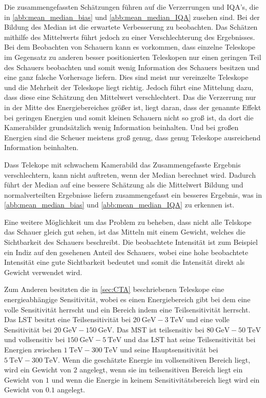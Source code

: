 Die zusammengefassten Schätzungen führen auf die Verzerrungen und IQA's, die in \autoref{abb:mean_median_bias} und \autoref{abb:mean_median_IQA} zusehen sind.
Bei der Bildung des Median ist die erwartete Verbesserung zu beobachten.
Das Schätzen mithilfe des Mittelwerts führt jedoch zu einer Verschlechterung des Ergebnisses.
Bei dem Beobachten von Schauern kann es vorkommen, dass einzelne Teleskope im Gegensatz zu anderen besser positionierten Teleskopen nur einen geringen Teil
des Schauers beobachten und somit wenig Information des Schauers besitzen und eine ganz falsche Vorhersage liefern.
Dies sind meist nur vereinzelte Teleskope und die Mehrheit der Teleskope liegt richtig.
Jedoch führt eine Mittelung dazu, dass diese eine Schätzung den Mittelwert verschlechtert.
Das die Verzerrung nur in der Mitte des Energiebereiches größer ist, liegt daran, dass der genannte Effekt bei geringen Energien und somit kleinen Schauern
nicht so groß ist, da dort die Kamerabilder grundsätzlich wenig Information beinhalten.
Und bei großen Energien sind die Scheuer meistens groß genug, dass genug Teleskope ausreichend Information beinhalten.

Dass Telekope mit schwachem Kamerabild das Zusammengefasste Ergebnis verschlechtern, kann nicht auftreten, wenn der Median berechnet wird.
Dadurch führt der Median auf eine bessere Schätzung als die Mittelwert Bildung und normalverteilten Ergebnisse liefern zusammengefasst ein besseres Ergebnis,
was in \autoref{abb:mean_median_bias} und \autoref{abb:mean_median_IQA} zu erkennen ist.

Eine weitere Möglichkeit um das Problem zu beheben, dass nicht alle Telskope das Schauer gleich gut sehen, ist das Mitteln mit einem Gewicht, welches die
Sichtbarkeit des Schauers beschreibt.
Die beobachtete Intensität ist zum Beispiel ein Indiz auf den gesehenen Anteil des Schauers, wobei eine hohe
beobachtete Intensität eine gute Sichtbarkeit bedeutet und somit die Intensität direkt als Gewicht verwendet wird.

Zum Anderen besitzten die in \autoref{sec:CTA} beschriebenen Teleskope eine energieabhängige Sensitivität, wobei
es einen Energiebereich gibt bei dem eine volle Sensitivität herrscht und ein Bereich indem eine Teilsensitivität
herrscht.
Das LST besitzt eine Teilsensitivität bei $\SI{20}{\giga\eV}-\SI{3}{\tera\eV}$ und eine volle Sensitivität bei
$\SI{20}{\giga\eV}-\SI{150}{\giga\eV}$.
Das MST ist teilsensitiv bei $\SI{80}{\giga\eV}-\SI{50}{\tera\eV}$ und vollsensitiv bei $\SI{150}{\giga\eV}-\SI{5}{\tera\eV}$
und das LST hat seine Teilsensitivität bei Energien zwischen $\SI{1}{\tera\eV}-\SI{300}{\tera\eV}$ und seine
Hauptsensitivität bei $\SI{5}{\tera\eV}-\SI{300}{\tera\eV}$.\cite{CTA_tec}
Wenn die geschätzte Energie im vollsensitiven Bereich liegt, wird ein Gewicht von $2$ angelegt, wenn sie im
teilsensitiven Bereich liegt ein Gewicht von $1$ und wenn die Energie in keinem Sensitivitätsbereich liegt
wird ein Gewicht von $0.1$ angelegt.

